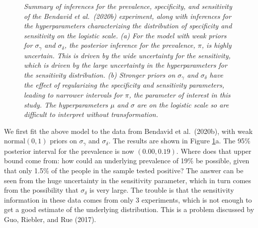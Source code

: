\documentclass[11pt]{article}
\begin{document}
\begin{figure}
  \caption{\em Summary of inferences for the prevalence, specificity, and sensitivity of the Bendavid et al.\ (2020b) experiment, along with inferences for the hyperparameters characterizing the distribution of specificity and sensitivity on the logistic scale.  (a) For the model with weak priors for $\sigma_{\gamma}$ and $\sigma_{\delta}$, the posterior inference for the prevalence, $\pi$, is highly uncertain.  This is driven by the wide uncertainty for the sensitivity, which is driven by the large uncertainty in the hyperparameters for the sensitivity distribution. (b) Stronger priors on  $\sigma_{\gamma}$ and $\sigma_{\delta}$ have the effect of regularizing the specificity and sensitivity parameters, leading to narrower intervals for $\pi$, the parameter of interest in this study.  The hyperparameters $\mu$ and $\sigma$ are on the logistic scale so are difficult to interpret without transformation.}
\label{posterior2}
\end{figure}

We first fit the above model to the data from Bendavid et al.\ (2020b), with weak $\mbox{normal}(0,1)$ priors on $\sigma_{\gamma}$ and $\sigma_{\delta}$.  The results are shown in Figure \ref{posterior2}a.  The 95\% posterior interval for the prevalence is now $(0.00, 0.19)$.  Where does that upper bound come from:  how could an underlying prevalence of 19\% be possible, given that only 1.5\% of the people in the sample tested positive?  The answer can be seen from the huge uncertainty in the sensitivity parameter, which in turn comes from the possibility that $\sigma_{\delta}$ is very large.  The trouble is that the sensitivity information in these data comes from only 3 experiments, which is not enough to get a good estimate of the underlying distribution.  This is a problem discussed by Guo, Riebler, and Rue (2017).
\end{document}
